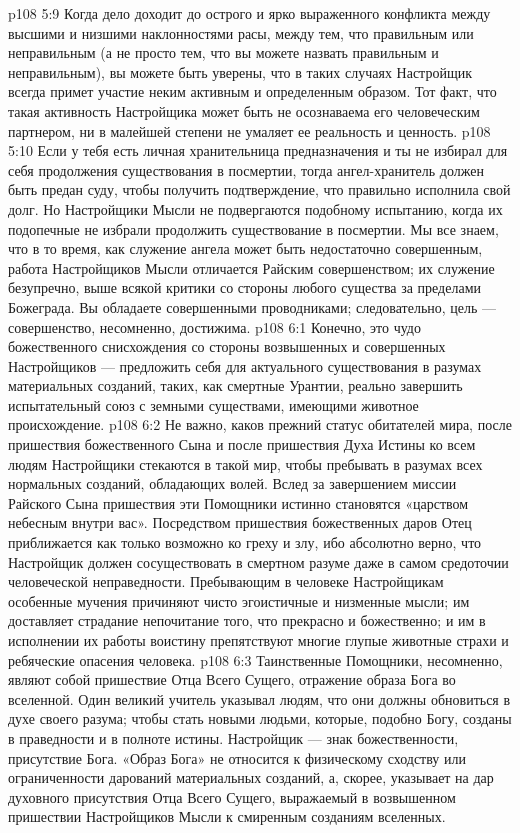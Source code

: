 \vs p108 5:9 Когда дело доходит до острого и ярко выраженного конфликта между высшими и низшими наклонностями расы, между тем, что  правильным или неправильным (а не просто тем, что вы можете назвать правильным и неправильным), вы можете быть уверены, что в таких случаях Настройщик всегда примет участие неким активным и определенным образом. Тот факт, что такая активность Настройщика может быть не осознаваема его человеческим партнером, ни в малейшей степени не умаляет ее реальность и ценность.
\vs p108 5:10 Если у тебя есть личная хранительница предназначения и ты не избирал для себя продолжения существования в посмертии, тогда ангел\hyp{}хранитель должен быть предан суду, чтобы получить подтверждение, что правильно исполнила свой долг. Но Настройщики Мысли не подвергаются подобному испытанию, когда их подопечные не избрали продолжить существование в посмертии. Мы все знаем, что в то время, как служение ангела может быть недостаточно совершенным, работа Настройщиков Мысли отличается Райским совершенством; их служение безупречно, выше всякой критики со стороны любого существа за пределами Божеграда. Вы обладаете совершенными проводниками; следовательно, цель --- совершенство, несомненно, достижима.
\vs p108 6:1 Конечно, это чудо божественного снисхождения со стороны возвышенных и совершенных Настройщиков --- предложить себя для актуального существования в разумах материальных созданий, таких, как смертные Урантии, реально завершить испытательный союз с земными существами, имеющими животное происхождение.
\vs p108 6:2 Не важно, каков прежний статус обитателей мира, после пришествия божественного Сына и после пришествия Духа Истины ко всем людям Настройщики стекаются в такой мир, чтобы пребывать в разумах всех нормальных созданий, обладающих волей. Вслед за завершением миссии Райского Сына пришествия эти Помощники истинно становятся «царством небесным внутри вас». Посредством пришествия божественных даров Отец приближается как только возможно ко греху и злу, ибо абсолютно верно, что Настройщик должен сосуществовать в смертном разуме даже в самом средоточии человеческой неправедности. Пребывающим в человеке Настройщикам особенные мучения причиняют чисто эгоистичные и низменные мысли; им доставляет страдание непочитание того, что прекрасно и божественно; и им в исполнении их работы воистину препятствуют многие глупые животные страхи и ребяческие опасения человека.
\vs p108 6:3 \pc Таинственные Помощники, несомненно, являют собой пришествие Отца Всего Сущего, отражение образа Бога во вселенной. Один великий учитель указывал людям, что они должны обновиться в духе своего разума; чтобы стать новыми людьми, которые, подобно Богу, созданы в праведности и в полноте истины. Настройщик --- знак божественности, присутствие Бога. «Образ Бога» не относится к физическому сходству или ограниченности дарований материальных созданий, а, скорее, указывает на дар духовного присутствия Отца Всего Сущего, выражаемый в возвышенном пришествии Настройщиков Мысли к смиренным созданиям вселенных.
